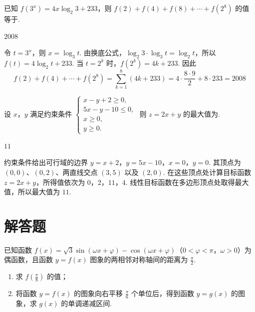 \begin{problem}
已知 \( f(3^{x}) = 4x \log_{2} 3 + 233 \)，则 \( f(2) + f(4) + f(8) + \cdots + f(2^{8}) \) 的值等于\fillinblank{}.
\end{problem}

\begin{answer}
\(2008\)
\end{answer}

\begin{solution}
令 \(t=3^x\)，则 \(x=\log_3t\). 由换底公式，\(\log_2 3\cdot\log_3t=\log_2t\)，所以 \(f(t)=4\log_2t+233\).
当 \(t=2^k\) 时，\(f(2^k)=4k+233\). 因此
\[
f(2)+f(4)+\cdots+f(2^8)
=\sum_{k=1}^{8}(4k+233)
=4\cdot\frac{8\cdot9}{2}+8\cdot233
 =2008
\]
\end{solution}

\begin{problem}
设 \(x\)，\(y\) 满足约束条件 \(\begin{cases}
x - y + 2 \geqslant 0,\\
5x - y - 10 \leqslant 0,\\
x \geqslant 0,\\
y \geqslant 0.
\end{cases}\) 则 \(z = 2x + y\) 的最大值为\fillinblank{}.
\end{problem}

\begin{answer}
\(11\)
\end{answer}

\begin{solution}
约束条件给出可行域的边界 \(y=x+2\)，\(y=5x-10\)，\(x=0\)，\(y=0\). 其顶点为 \((0,0)\)、\((0,2)\)、两直线交点 \((3,5)\) 以及 \((2,0)\). 在这些顶点处计算目标函数 \(z=2x+y\)，所得值依次为 \(0\)，\(2\)，\(11\)，\(4\).
线性目标函数在多边形顶点处取得最大值，所以最大值为 \(11\).
\end{solution}

\section{解答题}

\begin{problem}
已知函数 \( f(x) = \sqrt{3}\sin (\omega x + \varphi) - \cos (\omega x + \varphi) \)（\(0 < \varphi < \pi\)，\(\omega > 0\)）为偶函数，且函数 \( y = f(x) \) 图象的两相邻对称轴间的距离为 \( \frac{\pi}{2} \).
\begin{enumerate}
\item 求 \( f\left(\frac{\pi}{8}\right) \) 的值；
\item 将函数 \( y = f(x) \) 的图象向右平移 \( \frac{\pi}{6} \) 个单位后，得到函数 \( y = g(x) \) 的图象，求 \( g(x) \) 的单调递减区间.
\end{enumerate}
\end{problem}

